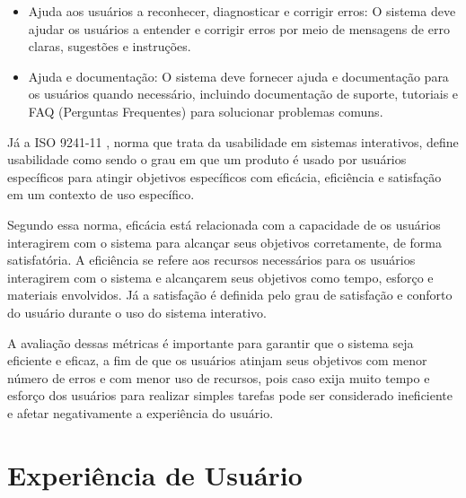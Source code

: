 \begin{description}
\begin{itemize}
            \item Ajuda aos usuários a reconhecer, diagnosticar e corrigir erros: O sistema deve ajudar os usuários a entender 
            e corrigir erros por meio de mensagens de erro claras, sugestões e instruções.

            \item Ajuda e documentação: O sistema deve fornecer ajuda e documentação para os usuários quando necessário, incluindo 
            documentação de suporte, tutoriais e FAQ (Perguntas Frequentes) para solucionar problemas comuns.
        \end{itemize}
\end{description}

Já a ISO 9241-11 \cite{iso9241}, norma que trata da usabilidade em sistemas interativos, define usabilidade como sendo o grau em que 
um produto é usado por usuários específicos para atingir objetivos específicos com eficácia, eficiência e satisfação em um contexto 
de uso específico.

Segundo essa norma, eficácia está relacionada com a capacidade de os usuários interagirem com o sistema para alcançar seus objetivos 
corretamente, de forma satisfatória. A eficiência se refere aos recursos necessários para os usuários interagirem 
com o sistema e alcançarem seus objetivos como tempo, esforço e materiais envolvidos. Já a satisfação é definida pelo grau de satisfação e 
conforto do usuário durante o uso do sistema interativo.

A avaliação dessas métricas é importante para garantir que o sistema seja eficiente e eficaz, a fim de que os usuários atinjam seus objetivos 
com menor número de erros e com menor uso de recursos, pois caso exija muito tempo e esforço dos usuários para realizar simples tarefas pode 
ser considerado ineficiente e afetar negativamente a experiência do usuário.

\section{Experiência de Usuário}
\label{sec:Experiência de Usuário}


